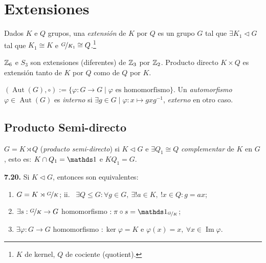 \section{Extensiones}

\begin{definition}
    Dados \(K\) e \(Q\) grupos, una \emph{extensión} de \(K \) por \(Q\) es un grupo \(G\) tal que \(\exists K_1 \lhd G\) tal que \(K_1 \cong K\) e \(\nicefrac{G}{K_1} \cong Q\).\footnote{\(K\) de kernel, \(Q\) de cociente (quotient).}
\end{definition}

\begin{example}
    \(\mathbb{Z}_6\) e \(S_3\) son extensiones (diferentes) de \(\mathbb{Z}_3\) por \(\mathbb{Z}_2\). Producto directo \(K \times Q\) es extensión tanto de \(K\) por \(Q\) como de \(Q\) por \(K\). 
\end{example}

\begin{definition}
    \((\operatorname{Aut}(G), \circ):= \{\varphi : G \to G \mid \varphi \text{ \ es homomorfismo}\}\). Un \emph{automorfismo} \(\varphi \in \operatorname{Aut}(G)\) es \emph{interno} si \(\exists g \in G \mid \varphi: x \mapsto gxg^{-1}\), \emph{externo} en otro caso. 
\end{definition}

\subsection*{Producto Semi-directo}

\begin{definition}
    \(G = K \rtimes Q\) (\emph{producto semi-directo}) si \(K \lhd G\) e \(\exists Q_1\cong Q\) \emph{complementar} de \(K\) en \(G\), esto es: \(K \cap Q_1 = \id\) e \(KQ_1 = G\). 
\end{definition}

\hypertarget{lemma720}{}
\begin{lemma}
    \textbf{7.20.} Si \(K \lhd G\), entonces son equivalentes: 
    \vspace{-0.2cm}
    \begin{enumerate}[left = 0.2cm, label = \roman*.]
        \item \(G = K \rtimes \nicefrac{G}{K}\); \hfill ii. \  \(\exists Q \leq G: \forall g \in G, \ \exists ! a \in K, \ !x\in Q : g=ax\);
        \item[iii.] \(\exists s : \nicefrac{G}{K} \to G\) homomorfismo \(: \pi \circ s= \id_{\nicefrac{G}{K}}\);
        \item[iv.] \(\exists \varphi : G\to G\) homomorfismo \(: \ker \varphi = K\) e \(\varphi(x)= x, \ \forall x \in \operatorname{Im}\varphi\).%
    \end{enumerate}
    \vspace{-0.2cm}
\end{lemma}

